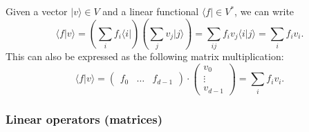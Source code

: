 \documentclass{article}
\theoremstyle{definition}
\newcommand{\ket}[1]{\vert #1 \rangle}
\newcommand{\bra}[1]{\langle #1 \vert}
\newcommand{\scalprod}[2]{\langle #1 \vert #2 \rangle}
\begin{document}
Given a vector $\ket{v}\in V$ and a linear functional $\bra{f}\in V^*$, we can write
\begin{equation*}
  \scalprod{f}{v} = \left(\sum_{i} f_i \bra{i}\right) \left(\sum_j v_j \ket{j}\right) = \sum_{ij} f_i v_j \scalprod{i}{j} = \sum_i f_i v_i.
\end{equation*}
This can also be expressed as the following matrix multiplication:
\begin{equation*}
  \scalprod{f}{v} = \begin{pmatrix}
    f_0 & \dots & f_{d-1}
  \end{pmatrix} \cdot 
  \begin{pmatrix}
    v_0 \\ \vdots \\ v_{d-1}
  \end{pmatrix} = \sum_i f_i v_i.
\end{equation*}
\subsubsection{Linear operators (matrices)}
\end{document}
